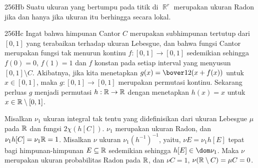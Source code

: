 \spheader 256Hb Suatu ukuran yang bertumpu pada titik di $\BbbR^r$ merupakan ukuran Radon
jika dan hanya jika ukuran itu berhingga secara lokal.   %

\spheader 256Hc   Ingat bahwa
himpunan Cantor $C$ merupakan subhimpunan tertutup dari $[0,1]$ yang terabaikan terhadap ukuran Lebesgue,
dan bahwa fungsi Cantor merupakan fungsi
tak menurun
kontinu $f:[0,1]\to[0,1]$ sedemikian sehingga $f(0)=0$, $f(1)=1$ dan
$f$ konstan pada setiap interval yang menyusun $[0,1]\setminus C$.
Akibatnya, jika kita menetapkan $g(x)=\bover12(x+f(x))$ untuk $x\in[0,1]$, maka
$g:[0,1]\to[0,1]$ merupakan permutasi kontinu.   Sekarang perluas $g$ menjadi permutasi $h:\Bbb R\to\Bbb R$ dengan
menetapkan $h(x)=x$ untuk $x\in\Bbb R\setminus[0,1]$.

Misalkan $\nu_1$ ukuran integral tak tentu yang didefinisikan dari ukuran
Lebesgue $\mu$ pada $\Bbb R$ dan
fungsi $2\chi(h[C])$.    $\nu_1$ merupakan ukuran Radon, dan
$\nu_1h[C]=\nu_1\Bbb R=1$.   Misalkan $\nu$ ukuran $\nu_1(h^{-1})^{-1}$,
yaitu,
$\nu E=\nu_1h[E]$ tepat bagi himpunan-himpunan $E\subseteq\Bbb R$ sedemikian sehingga
$h[E]\in\dom\nu_1$.   Maka $\nu$ merupakan ukuran probabilitas Radon pada
$\Bbb R$, dan $\nu C=1$,
$\nu(\Bbb R\setminus C)=\mu C=0$.

